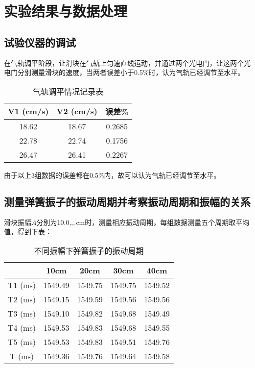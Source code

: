 \documentclass[12pt]{article}
\begin{document}
\section{实验结果与数据处理}
\subsection{试验仪器的调试}
在气轨调平阶段，让滑块在气轨上匀速直线运动，并通过两个光电门，让这两个光电门分别测量滑块的速度，当两者误差小于0.5\%时，认为气轨已经调节至水平。

\begin{table}[htbp]
    \centering
    \begin{tabular}{|c|c|c|}
    \hline
    V1 (cm/s) & V2 (cm/s) & 误差\% \\
    \hline
    18.62 & 18.67 & 0.2685 \\
    \hline
    22.78 & 22.74 & 0.1756 \\
    \hline
    26.47 & 26.41 & 0.2267 \\
    \hline
    \end{tabular}%
    \caption{气轨调平情况记录表}
\end{table}%

由于以上3组数据的误差都在0.5\%内，故可以认为气轨已经调节至水平。

\subsection{测量弹簧振子的振动周期并考察振动周期和振幅的关系}
滑块振幅$ A $分别为10.0,,,\,cm时，测量相应振动周期，每组数据测量五个周期取平均值，得到下表：

\begin{table}[htbp]
    \centering
    \begin{tabular}{|c|c|c|c|c|}
    \hline
        & 10cm & 20cm & 30cm & 40cm \\
    \hline
    T1 (ms) & 1549.49  & 1549.75  & 1549.75  & 1549.52  \\
    \hline
    T2 (ms) & 1549.15  & 1549.59  & 1549.56  & 1549.56  \\
    \hline
    T3 (ms) & 1549.10  & 1549.82  & 1549.68  & 1549.49  \\
    \hline
    T4 (ms) & 1549.53  & 1549.83  & 1549.68  & 1549.55  \\
    \hline
    T5 (ms) & 1549.53  & 1549.83  & 1549.51  & 1549.76  \\
    \hline
    T (ms) & 1549.36  & 1549.76  & 1549.64  & 1549.58  \\
    \hline
    \end{tabular}%
    \caption{不同振幅下弹簧振子的振动周期}
\end{table}
\end{document}
